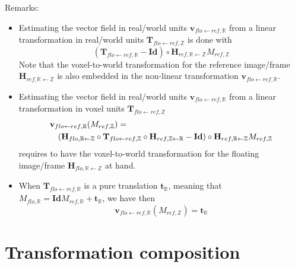 Remarks:
\begin{itemize}

\item Estimating the vector field in real/world units $\mathbf{v}_{flo \leftarrow ref, \mathbb{R}}$ from a linear transformation in real/world units $\mathbf{T}_{flo \leftarrow ref, \mathbb{Z}}$ is done with 
\begin{displaymath}
\left( \mathbf{T}_{flo \leftarrow ref, \mathbb{R}} - \mathbf{Id} \right) \circ
\mathbf{H}_{ref, \mathbb{R} \leftarrow \mathbb{Z}} M_{ref, \mathbb{Z}}
\end{displaymath}
Note that the voxel-to-world transformation for the reference image/frame $\mathbf{H}_{ref, \mathbb{R} \leftarrow \mathbb{Z}}$ is also embedded in the non-linear transformation $\mathbf{v}_{flo \leftarrow ref, \mathbb{R}}$.

\item Estimating the vector field in real/world units $\mathbf{v}_{flo \leftarrow ref, \mathbb{R}}$ from a linear transformation in voxel units $\mathbf{T}_{flo \leftarrow ref, \mathbb{Z}}$ 
\begin{eqnarray*}
\lefteqn{\mathbf{v}_{flo \leftarrow ref, \mathbb{R}}(M_{ref, \mathbb{Z}}) = } \\
& &
\left( \mathbf{H}_{flo,\mathbb{R} \leftarrow \mathbb{Z}} \circ
\mathbf{T}_{flo \leftarrow ref, \mathbb{Z}} \circ
\mathbf{H}_{ref,\mathbb{Z} \leftarrow \mathbb{R}} - \mathbf{Id} \right) \circ
\mathbf{H}_{ref, \mathbb{R} \leftarrow \mathbb{Z}} M_{ref, \mathbb{Z}}
\end{eqnarray*}
requires to have the voxel-to-world transformation for the floating image/frame $\mathbf{H}_{flo,\mathbb{R} \leftarrow \mathbb{Z}}$ at hand.

\item When $\mathbf{T}_{flo \leftarrow ref, \mathbb{R}}$ is a pure translation $\mathbf{t}_{\mathbb{R}}$, meaning that 
$M_{flo, \mathbb{R}} = 
\mathbf{Id} M_{ref, \mathbb{R}} + \mathbf{t}_{\mathbb{R}}$, we have then
\begin{displaymath}
\mathbf{v}_{flo \leftarrow ref, \mathbb{R}}(M_{ref, \mathbb{Z}}) = \mathbf{t}_{\mathbb{R}}
\end{displaymath}

\end{itemize}










\section{Transformation composition}

